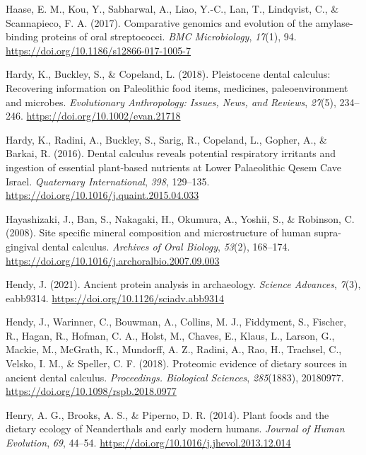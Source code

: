 \documentclass[
  b5paper,
]{book}
\newlength{\cslhangindent}
\newenvironment{CSLReferences}[2] %
 {\begin{list}{}{%
  \setlength{\itemindent}{0pt}
  \setlength{\leftmargin}{0pt}
  \setlength{\parsep}{0pt}
  \ifodd #1
   \setlength{\leftmargin}{\cslhangindent}
   \setlength{\itemindent}{-1\cslhangindent}
  \fi
  \setlength{\itemsep}{#2\baselineskip}}}
 {\end{list}}
\begin{document}
\begin{CSLReferences}{1}{0}
Haase, E. M., Kou, Y., Sabharwal, A., Liao, Y.-C., Lan, T., Lindqvist,
C., \& Scannapieco, F. A. (2017). Comparative genomics and evolution of
the amylase-binding proteins of oral streptococci. \emph{BMC
Microbiology}, \emph{17}(1), 94.
\url{https://doi.org/10.1186/s12866-017-1005-7}

Hardy, K., Buckley, S., \& Copeland, L. (2018). Pleistocene dental
calculus: {Recovering} information on {Paleolithic} food items,
medicines, paleoenvironment and microbes. \emph{Evolutionary
Anthropology: Issues, News, and Reviews}, \emph{27}(5), 234--246.
\url{https://doi.org/10.1002/evan.21718}

Hardy, K., Radini, A., Buckley, S., Sarig, R., Copeland, L., Gopher, A.,
\& Barkai, R. (2016). Dental calculus reveals potential respiratory
irritants and ingestion of essential plant-based nutrients at {Lower
Palaeolithic Qesem Cave Israel}. \emph{Quaternary International},
\emph{398}, 129--135. \url{https://doi.org/10.1016/j.quaint.2015.04.033}

Hayashizaki, J., Ban, S., Nakagaki, H., Okumura, A., Yoshii, S., \&
Robinson, C. (2008). Site specific mineral composition and
microstructure of human supra-gingival dental calculus. \emph{Archives
of Oral Biology}, \emph{53}(2), 168--174.
\url{https://doi.org/10.1016/j.archoralbio.2007.09.003}

Hendy, J. (2021). Ancient protein analysis in archaeology. \emph{Science
Advances}, \emph{7}(3), eabb9314.
\url{https://doi.org/10.1126/sciadv.abb9314}

Hendy, J., Warinner, C., Bouwman, A., Collins, M. J., Fiddyment, S.,
Fischer, R., Hagan, R., Hofman, C. A., Holst, M., Chaves, E., Klaus, L.,
Larson, G., Mackie, M., McGrath, K., Mundorff, A. Z., Radini, A., Rao,
H., Trachsel, C., Velsko, I. M., \& Speller, C. F. (2018). Proteomic
evidence of dietary sources in ancient dental calculus.
\emph{Proceedings. Biological Sciences}, \emph{285}(1883), 20180977.
\url{https://doi.org/10.1098/rspb.2018.0977}

Henry, A. G., Brooks, A. S., \& Piperno, D. R. (2014). Plant foods and
the dietary ecology of {Neanderthals} and early modern humans.
\emph{Journal of Human Evolution}, \emph{69}, 44--54.
\url{https://doi.org/10.1016/j.jhevol.2013.12.014}


\end{CSLReferences}
\end{document}

